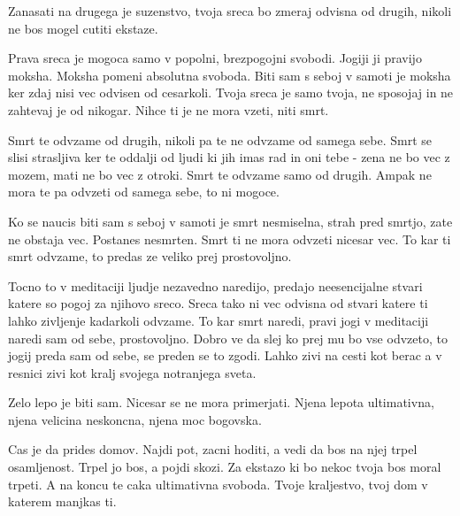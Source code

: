 Zanasati na drugega je suzenstvo, tvoja sreca bo zmeraj odvisna od drugih, nikoli ne bos mogel cutiti ekstaze. 

Prava sreca je mogoca samo v popolni, brezpogojni svobodi. Jogiji ji pravijo moksha. Moksha pomeni absolutna svoboda. Biti sam s seboj v samoti je moksha ker zdaj nisi vec odvisen od cesarkoli. Tvoja sreca je samo tvoja, ne sposojaj in ne zahtevaj je od nikogar. Nihce ti je ne mora vzeti, niti smrt. 

Smrt te odvzame od drugih, nikoli pa te ne odvzame od samega sebe. Smrt se slisi strasljiva ker te oddalji od ljudi ki jih imas rad in oni tebe - zena ne bo vec z mozem, mati ne bo vec z otroki. Smrt te odvzame samo od drugih. Ampak ne mora te pa odvzeti od samega sebe, to ni mogoce. 

Ko se naucis biti sam s seboj v samoti je smrt nesmiselna, strah pred smrtjo, zate ne obstaja vec. Postanes nesmrten. Smrt ti ne mora odvzeti nicesar vec. To kar ti smrt odvzame, to predas ze veliko prej prostovoljno. 

Tocno to v meditaciji ljudje nezavedno naredijo, predajo neesencijalne stvari katere so pogoj za njihovo sreco. Sreca tako ni vec odvisna od stvari katere ti lahko zivljenje kadarkoli odvzame. To kar smrt naredi, pravi jogi v meditaciji naredi sam od sebe, prostovoljno. Dobro ve da slej ko prej mu bo vse odvzeto, to jogij preda sam od sebe, se preden se to zgodi. Lahko zivi na cesti kot berac a v resnici zivi kot kralj svojega notranjega sveta. 

Zelo lepo je biti sam. Nicesar se ne mora primerjati. Njena lepota ultimativna, njena velicina neskoncna, njena moc bogovska. 

Cas je da prides domov. Najdi pot, zacni hoditi, a vedi da bos na njej trpel osamljenost. Trpel jo bos, a pojdi skozi. Za ekstazo ki bo nekoc tvoja bos moral trpeti. A na koncu te caka ultimativna svoboda. Tvoje kraljestvo, tvoj dom v katerem manjkas ti. 